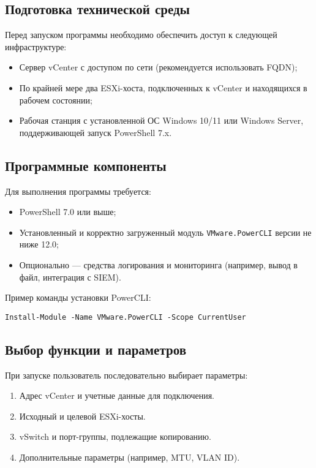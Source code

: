 \subsection{Подготовка технической среды}
Перед запуском программы необходимо обеспечить доступ к следующей инфраструктуре:
\begin{itemize}
  \item Сервер vCenter с доступом по сети (рекомендуется использовать FQDN);
  \item По крайней мере два ESXi-хоста, подключенных к vCenter и находящихся в рабочем состоянии;
  \item Рабочая станция с установленной ОС Windows 10/11 или Windows Server, поддерживающей запуск PowerShell 7.x.
\end{itemize}

\subsection{Программные компоненты}
Для выполнения программы требуется:
\begin{itemize}
  \item PowerShell 7.0 или выше;
  \item Установленный и корректно загруженный модуль \texttt{VMware.PowerCLI} версии не ниже 12.0;
  \item Опционально — средства логирования и мониторинга (например, вывод в файл, интеграция с SIEM).
\end{itemize}

Пример команды установки PowerCLI:
\begin{verbatim}
Install-Module -Name VMware.PowerCLI -Scope CurrentUser
\end{verbatim}

\subsection{Выбор функции и параметров}
При запуске пользователь последовательно выбирает параметры:
\begin{enumerate}
  \item Адрес vCenter и учетные данные для подключения.
  \item Исходный и целевой ESXi-хосты.
  \item vSwitch и порт-группы, подлежащие копированию.
  \item Дополнительные параметры (например, MTU, VLAN ID).
\end{enumerate}

